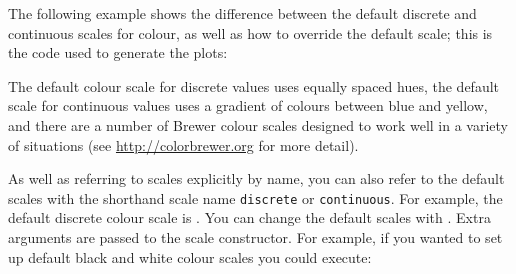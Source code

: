 The following example shows the difference between the default discrete and continuous scales for colour, as well as how to override the default scale; this is the code used to generate the plots:


% 


% 



The default colour scale for discrete values uses equally spaced hues, the default scale for continuous values uses a gradient of colours between blue and yellow, and there are a number of Brewer colour scales designed to work well in a variety of situations (see \url{http://colorbrewer.org} for more detail).

As well as referring to scales explicitly by name, you can also refer to the default scales with the shorthand scale name {\tt discrete} or {\tt continuous}.  For example, the default discrete colour scale is .  You can change the default scales with .  Extra arguments are passed to the scale constructor.  For example, if you wanted to set up default black and white colour scales you could execute:

% 



